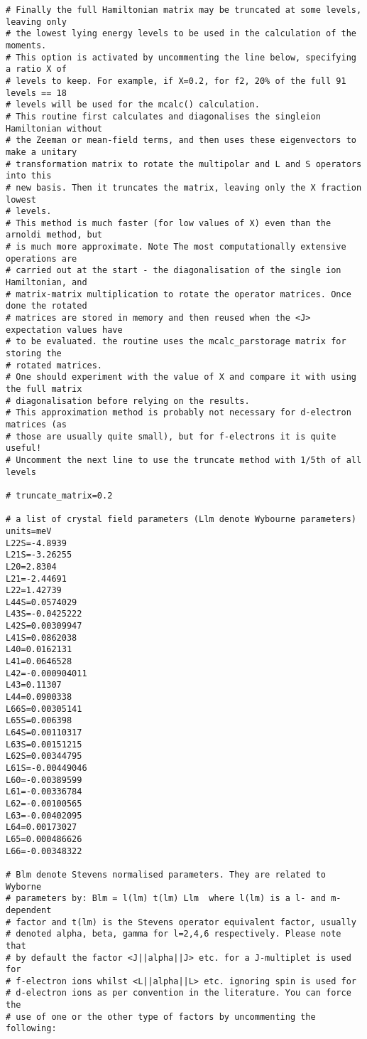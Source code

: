 {\begin{verbatim}
# Finally the full Hamiltonian matrix may be truncated at some levels, leaving only
# the lowest lying energy levels to be used in the calculation of the moments.
# This option is activated by uncommenting the line below, specifying a ratio X of
# levels to keep. For example, if X=0.2, for f2, 20% of the full 91 levels == 18
# levels will be used for the mcalc() calculation.
# This routine first calculates and diagonalises the singleion Hamiltonian without 
# the Zeeman or mean-field terms, and then uses these eigenvectors to make a unitary 
# transformation matrix to rotate the multipolar and L and S operators into this
# new basis. Then it truncates the matrix, leaving only the X fraction lowest 
# levels.
# This method is much faster (for low values of X) even than the arnoldi method, but
# is much more approximate. Note The most computationally extensive operations are 
# carried out at the start - the diagonalisation of the single ion Hamiltonian, and
# matrix-matrix multiplication to rotate the operator matrices. Once done the rotated 
# matrices are stored in memory and then reused when the <J> expectation values have 
# to be evaluated. the routine uses the mcalc_parstorage matrix for storing the 
# rotated matrices.
# One should experiment with the value of X and compare it with using the full matrix 
# diagonalisation before relying on the results. 
# This approximation method is probably not necessary for d-electron matrices (as 
# those are usually quite small), but for f-electrons it is quite useful!
# Uncomment the next line to use the truncate method with 1/5th of all levels

# truncate_matrix=0.2

# a list of crystal field parameters (Llm denote Wybourne parameters)
units=meV
L22S=-4.8939
L21S=-3.26255
L20=2.8304
L21=-2.44691
L22=1.42739
L44S=0.0574029
L43S=-0.0425222
L42S=0.00309947
L41S=0.0862038
L40=0.0162131
L41=0.0646528
L42=-0.000904011
L43=0.11307
L44=0.0900338
L66S=0.00305141
L65S=0.006398
L64S=0.00110317
L63S=0.00151215
L62S=0.00344795
L61S=-0.00449046
L60=-0.00389599
L61=-0.00336784
L62=-0.00100565
L63=-0.00402095
L64=0.00173027
L65=0.000486626
L66=-0.00348322

# Blm denote Stevens normalised parameters. They are related to Wyborne
# parameters by: Blm = l(lm) t(lm) Llm  where l(lm) is a l- and m-dependent
# factor and t(lm) is the Stevens operator equivalent factor, usually 
# denoted alpha, beta, gamma for l=2,4,6 respectively. Please note that
# by default the factor <J||alpha||J> etc. for a J-multiplet is used for
# f-electron ions whilst <L||alpha||L> etc. ignoring spin is used for 
# d-electron ions as per convention in the literature. You can force the
# use of one or the other type of factors by uncommenting the following:


\end{verbatim}}
